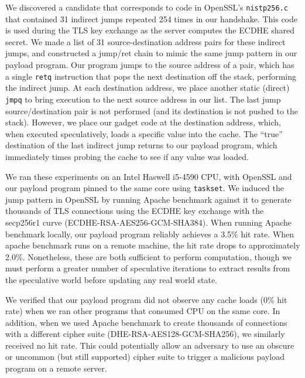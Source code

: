 We discovered a candidate that corresponds to code in OpenSSL's
\texttt{nistp256.c} that contained 31 indirect jumps repeated 254 times in our
handshake. This code is used during the TLS key exchange as the server computes
the ECDHE shared secret. We made a list of 31 source-destination address pairs
for these indirect jumps, and constructed a jump/ret chain to mimic the same
jump pattern in
our payload program. Our program jumps to the source address of a pair,
which has a single \texttt{retq} instruction that pops the next
destination off the stack, performing the indirect jump. At each destination
address, we place another static (direct) \texttt{jmpq} to bring execution to the
next source address in our list. The last jump source/destination pair is not
performed (and its destination is not pushed to the stack). However, we place
our gadget code at the destination address, which, when executed speculatively,
loads a specific value into the cache.
The ``true'' destination of the last indirect jump returns to our
payload program, which immediately times probing the cache to see if any value was
loaded.

We ran these experiments on an Intel Haswell
i5-4590 CPU, with OpenSSL and our payload program pinned to the same core using
\texttt{taskset}.
We induced the jump pattern in OpenSSL by running Apache benchmark against it to
generate thousands of TLS connections using the ECDHE key exchange with the
secp256r1 curve (ECDHE-RSA-AES256-GCM-SHA384). When running Apache benchmark locally, our payload program
reliably achieves a 3.5\% hit rate. When apache benchmark runs on a remote
machine, the hit rate drops to approximately 2.0\%. Nonetheless, these are both
sufficient to perform computation, though we must perform a greater number of
speculative iterations
to extract results from the speculative world before updating any real world state.

We verified that our payload program did not observe any cache loads (0\% hit
rate) when we ran
other programs that consumed CPU on the same core. In addition, when we used
Apache benchmark to create thousands of connections with a different cipher
suite (DHE-RSA-AES128-GCM-SHA256), we similarly received no hit rate. This
could potentially allow an adversary to use an obscure or uncommon (but still
supported) cipher suite to trigger a malicious payload program on a remote server.

